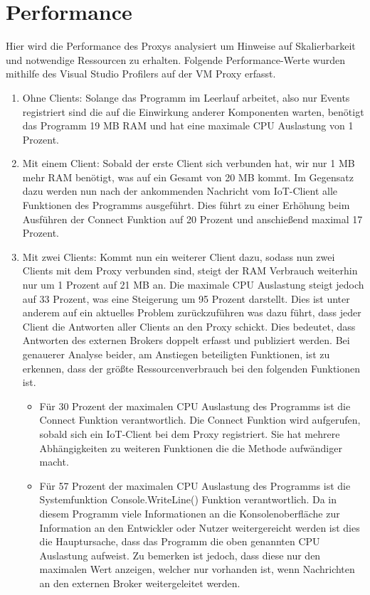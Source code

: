 \section{Performance}
    Hier wird die Performance des Proxys analysiert um Hinweise auf Skalierbarkeit und notwendige Ressourcen zu erhalten.
    Folgende Performance-Werte wurden mithilfe des Visual Studio Profilers auf der \ac{VM} Proxy erfasst.
    
    \begin{enumerate}
        \item Ohne Clients:
        Solange das Programm im Leerlauf arbeitet, also nur Events registriert sind die auf die Einwirkung anderer Komponenten warten, benötigt das Programm 19 MB \ac{RAM} und hat eine maximale CPU Auslastung von 1 Prozent.
        \item Mit einem Client:
        Sobald der erste Client sich verbunden hat, wir nur 1 MB mehr \ac{RAM} benötigt, was auf ein Gesamt von 20 MB kommt. Im Gegensatz dazu werden nun nach der ankommenden Nachricht vom \ac{IoT}-Client alle Funktionen des Programms ausgeführt. Dies führt zu einer Erhöhung beim Ausführen der Connect Funktion auf 20 Prozent und anschießend maximal 17 Prozent.
        \item Mit zwei Clients:
        Kommt nun ein weiterer Client dazu, sodass nun zwei Clients mit dem Proxy verbunden sind, steigt der \ac{RAM} Verbrauch weiterhin nur um 1 Prozent auf 21 MB an. Die maximale CPU Auslastung steigt jedoch auf 33 Prozent, was eine Steigerung um 95 Prozent darstellt. Dies ist unter anderem auf ein aktuelles Problem %
        zurückzuführen was dazu führt, dass jeder Client die Antworten aller Clients an den Proxy schickt. Dies bedeutet, dass Antworten des externen Brokers doppelt erfasst und publiziert werden.
        Bei genauerer Analyse beider, am Anstiegen beteiligten Funktionen, ist zu erkennen, dass der größte Ressourcenverbrauch bei den folgenden Funktionen ist.
        \begin{itemize}
            \item Für 30 Prozent der maximalen CPU Auslastung des Programms ist die Connect Funktion verantwortlich. Die Connect Funktion wird aufgerufen, sobald sich ein \ac{IoT}-Client bei dem Proxy registriert. Sie hat mehrere Abhängigkeiten zu weiteren Funktionen die die Methode aufwändiger macht.  
            \item Für 57 Prozent der maximalen CPU Auslastung des Programms ist die Systemfunktion Console.WriteLine() Funktion verantwortlich. Da in diesem Programm viele Informationen an die Konsolenoberfläche zur Information an den Entwickler oder Nutzer weitergereicht werden ist dies die Hauptursache, dass das Programm die oben genannten CPU Auslastung aufweist. Zu bemerken ist jedoch, dass diese nur den maximalen Wert anzeigen, welcher nur vorhanden ist, wenn Nachrichten an den externen Broker weitergeleitet werden.
        \end{itemize}
    \end{enumerate}